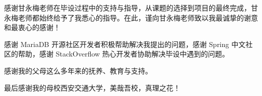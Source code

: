 
感谢甘永梅老师在毕设过程中的支持与指导，从课题的选择到项目的最终完成，甘永梅老师都始终给予了我悉心的指导。在此，谨向甘永梅老师致以我最诚挚的谢意和最衷心的感谢！

感谢 MariaDB 开源社区开发者积极帮助解决我提出的问题，感谢 Spring 中文社区的帮助，感谢 StackOverflow 热心开发者协助解决毕设中遇到的问题。

感谢我的父母这么多年来的抚养、教育与支持。

最后感谢我的母校西安交通大学，美哉吾校，真理之花！
